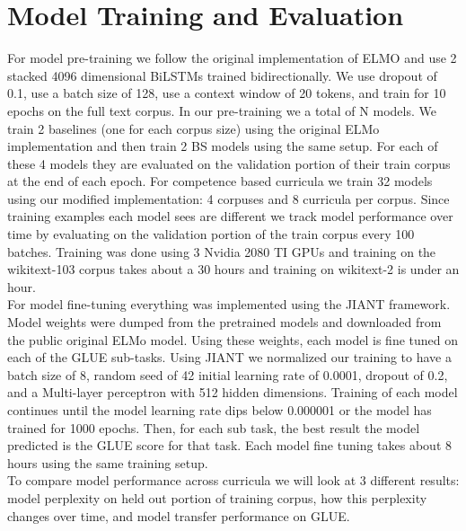 \section{Model Training and Evaluation}
\label{chap:method:sec:training}
For model pre-training we follow the original implementation of ELMO and use 2 stacked 4096 dimensional BiLSTMs trained bidirectionally. We use dropout of 0.1, use a batch size of 128, use a context window of 20 tokens, and train for 10 epochs on the full text corpus. In our pre-training we a total of N models. We train 2 baselines (one for each corpus size) using the original ELMo implementation and then train 2 BS models using the same setup. For each of these 4 models they are evaluated on the validation portion of their train corpus at the end of each epoch.  For competence based curricula we train 32 models using our modified implementation: 4 corpuses and 8 curricula per corpus. Since training examples each model sees are different we track model performance over time by evaluating on the validation portion of the train corpus every 100 batches.  Training was done using 3 Nvidia 2080 TI GPUs and training on the wikitext-103 corpus takes about a 30 hours and training on wikitext-2 is under an hour. \\ 
For model fine-tuning everything was implemented using the JIANT framework. Model weights were dumped from the pretrained models and downloaded from the public original ELMo model. Using these weights, each model is fine tuned on each of the GLUE sub-tasks. Using JIANT we normalized our training to have a batch size of 8, random seed of 42 initial learning rate of 0.0001, dropout of 0.2, and a Multi-layer perceptron with 512 hidden dimensions. Training of each model continues until the model learning rate dips below 0.000001 or the model has trained for 1000 epochs. Then, for each sub task, the best result the model predicted is the GLUE score for that task. Each model fine tuning takes about 8 hours using the same training setup. \\
To compare model performance across curricula we will look at 3 different results: model perplexity on held out portion of training corpus, how this perplexity changes over time, and model transfer performance on GLUE. 